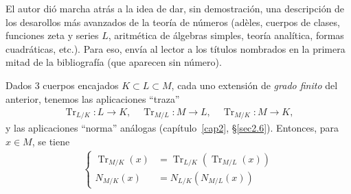 \documentclass[10pt,oneside,bibtotoc,smallheadings,leqno,a5paper,DIV=12]{scrbook}
\renewcommand{\to}[1][]{\xrightarrow{#1}}
\DeclareMathOperator{\Tr}{Tr}
\numberwithin{equation}{section}
\theoremstyle{defi}
\theoremstyle{enonce}
\theoremstyle{rem}
\numberwithin{theorem}{section}
\numberwithin{proposition}{section}
\numberwithin{definition}{section}
\numberwithin{lemma}{section}
\numberwithin{corollary}{section}
\numberwithin{example}{section}
\numberwithin{footnote}{section}%
\begin{document}
El autor di\'o marcha atr\'as a la idea de dar, sin demostraci\'on, una descripci\'on de los desarollos m\'as avanzados
de la teor\'ia de n\'umeros (ad\`eles, cuerpos de clases, funciones zeta y series $L$, aritm\'etica de \'algebras
simples, teor\'ia anal\'itica, formas cuadr\'aticas, etc.). Para eso, env\'ia al lector a los t\'itulos nombrados
en la primera mitad de la bibliograf\'ia (que aparecen sin n\'umero).


Dados $3$ cuerpos encajados $K\subset L\subset M$, cada uno extensi\'on de {\em grado finito} del anterior, tenemos las
aplicaciones ``traza''
\begin{gather*}
\Tr_{L/K}:L\to K,\quad\Tr_{M/L}:M\to L,\quad\Tr_{M/K}:M\to K,
\end{gather*}
y las aplicaciones ``norma'' an\'alogas (cap\'itulo~\ref{cap2}, \S\ref{sec2.6}). Entonces, para $x\in M$, se tiene
\begin{gather}
\left\{\begin{aligned}
\Tr_{M/K}(x) &= \Tr_{L/K}(\Tr_{M/L}(x))\\
N_{M/K}(x) &= N_{L/K}(N_{M/L}(x))
\end{aligned}
\right.
\end{gather}

\end{document}
